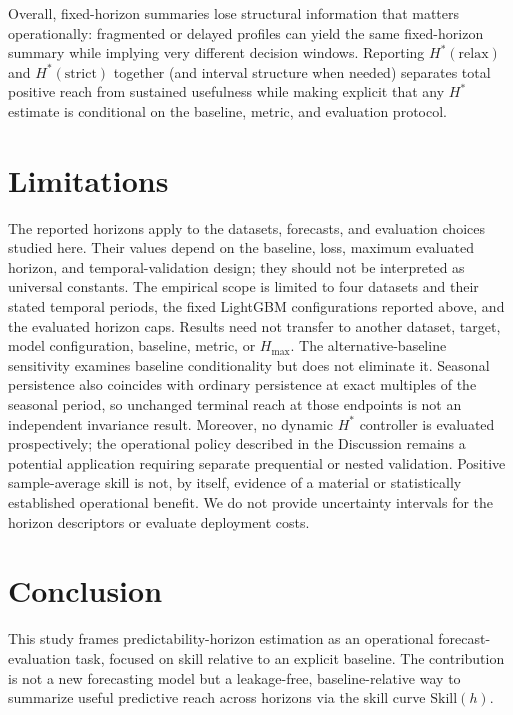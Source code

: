 \documentclass[pdflatex]{sn-jnl}
\begin{document}
Overall, fixed-horizon summaries lose structural information that matters operationally: fragmented or delayed profiles can yield the same fixed-horizon summary while implying very different decision windows. Reporting $H^*(\mathrm{relax})$ and $H^*(\mathrm{strict})$ together (and interval structure when needed) separates total positive reach from sustained usefulness while making explicit that any $H^*$ estimate is conditional on the baseline, metric, and evaluation protocol.

\section{Limitations}

The reported horizons apply to the datasets, forecasts, and evaluation
choices studied here. Their values depend on the baseline, loss,
maximum evaluated horizon, and temporal-validation design; they should
not be interpreted as universal constants.
The empirical scope is limited to four datasets and their stated temporal
periods, the fixed LightGBM configurations reported above, and the evaluated
horizon caps. Results need not transfer to another dataset, target, model
configuration, baseline, metric, or $H_{\max}$. The alternative-baseline
sensitivity examines baseline conditionality but
does not eliminate it. Seasonal persistence also coincides with ordinary
persistence at exact multiples of the seasonal period, so unchanged terminal
reach at those endpoints is not an independent invariance result. Moreover, no dynamic $H^*$ controller is evaluated
prospectively; the operational policy described in the Discussion remains a
potential application requiring separate prequential or nested validation.
Positive sample-average skill is not, by itself, evidence of a material or
statistically established operational benefit. We do not provide uncertainty
intervals for the horizon descriptors or evaluate deployment costs.


\section{Conclusion}

This study frames predictability-horizon estimation as an operational
forecast-evaluation task, focused on skill relative to an explicit
baseline. The contribution is not a new forecasting model but a
leakage-free, baseline-relative way to summarize useful predictive reach
across horizons via the skill curve $\mathrm{Skill}(h)$.
\end{document}
